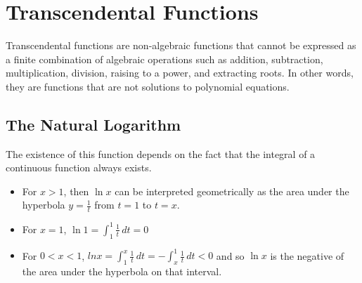 \section{Transcendental Functions}

Transcendental functions are non-algebraic functions that cannot be expressed as a finite combination of algebraic operations such as addition, subtraction, multiplication, division, raising to a power, and extracting roots. In other words, they are functions that are not solutions to polynomial equations.

\subsection{The Natural Logarithm}


The existence of this function depends on the fact that the integral of a continuous function always exists.

\begin{itemize}
    \item For $x > 1$, then $\ln{x}$ can be interpreted geometrically as the area under the hyperbola $y = \frac{1}{t}$ from $t = 1$ to $t = x$.
    \item For $x = 1$, $\ln{1} = \int_1^1 \frac{1}{t} \, dt = 0$
    \item For $0 < x < 1$, $ln{x} = \int_1^x \frac{1}{t} \, dt = - \int_x^1 \frac{1}{t} \, dt < 0$ and so $\ln{x}$ is the negative of the area under the hyperbola on that interval.
\end{itemize}

